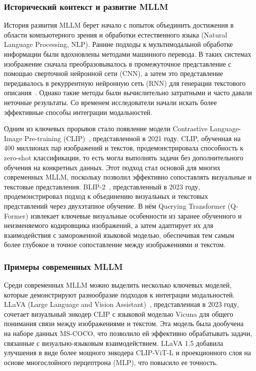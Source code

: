 \documentclass[LI,KR]{HSEUniversity}
\begin{document}
\subsubsection*{Исторический контекст и развитие MLLM}

История развития MLLM берет начало с попыток объединить достижения в области компьютерного зрения и обработки естественного языка (Natural Language Processing, NLP).
Ранние подходы к мультимодальной обработке информации были вдохновлены методами машинного перевода.
В таких системах изображение сначала преобразовывалось в промежуточное представление с помощью сверточной нейронной сети (CNN), а затем это представление передавалось в рекуррентную нейронную сеть (RNN) для генерации текстового описания~\cite{imagecaptioningdeeplearning}.
Однако такие методы были вычислительно затратными и часто давали неточные результаты.
Со временем исследователи начали искать более эффективные способы интеграции модальностей.

Одним из ключевых прорывов стало появление модели Contrastive Language-Image Pre-training (CLIP)~\cite{clip}, представленной в 2021 году.
CLIP, обученная на 400 миллионах пар изображений и текстов, продемонстрировала способность к zero-shot классификации,
то есть могла выполнять задачи без дополнительного обучения на конкретных данных.
Этот подход стал основой для многих современных MLLM, поскольку позволил эффективно сопоставлять визуальные и текстовые представления.
BLIP-2~\cite{blip2}, представленный в 2023 году, продемонстрировал подход к объединению визуальных и текстовых представлений через двухэтапное обучение.
В нём Querying Transformer (Q-Former) извлекает ключевые визуальные особенности из заранее обученного и неизменяемого кодировщика изображений,
а затем адаптирует их для взаимодействия с замороженной языковой моделью, обеспечивая тем самым более глубокое и точное сопоставление между изображениями и текстом.

\subsubsection*{Примеры современных MLLM}

Среди современных MLLM можно выделить несколько ключевых моделей, которые демонстрируют разнообразие подходов к интеграции модальностей.
LLaVA (Large Language and Vision Assistant)~\cite{llava}, представленная в 2023 году, сочетает визуальный энкодер CLIP с языковой моделью Vicuna для общего понимания связи между изображениями и текстом.
Эта модель была дообучена на наборе данных MS-COCO, что позволило ей эффективно обрабатывать задачи, связанные с визуально-языковым взаимодействием.
LLaVA 1.5 добавила улучшения в виде более мощного энкодера CLIP-ViT-L и проекционного слоя на основе многослойного перцептрона (MLP), что повысило ее точность.
\end{document}
